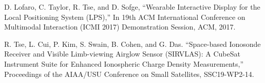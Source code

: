 \documentclass[10pt,a4paper,ragged2e,withhyper]{altacv}
\begin{document}
\begin{paracol}{2}
\begin{thebibliography}{2}
D. Lofaro, C. Taylor, R. Tse, and D. Sofge, “Wearable Interactive Display for the Local Positioning System (LPS),” In 19th ACM International Conference on Multimodal Interaction (ICMI 2017) Demonstration Session, ACM, 2017.

R. Tse, L. Cui, P. Kim, S. Swain, B. Cohen, and G. Das. “Space-based Ionosonde Receiver and Visible Limb-viewing Airglow Sensor (SIRVLAS): A CubeSat Instrument Suite for Enhanced Ionospheric Charge Density Measurements,” Proceedings of the AIAA/USU Conference on Small Satellites, SSC19-WP2-14.
 
\end{thebibliography}

\end{paracol}
\end{document}
